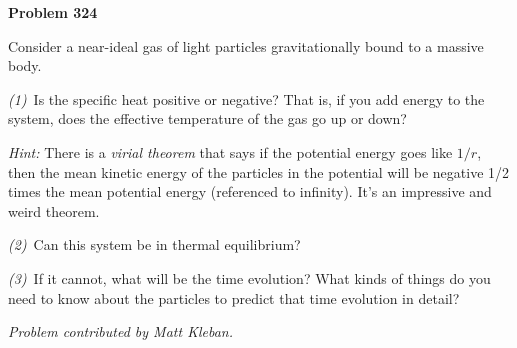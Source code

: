 \documentclass[12pt]{article}
\begin{document}
\begin{pottproblem}
\textbf{Problem 324}

Consider a near-ideal gas of light particles gravitationally bound to a massive body.

\textsl{(1)}~Is the specific heat positive or negative?
That is, if you add energy to the system, does the effective temperature of the gas go up or down?

\textsl{Hint:} There is a \emph{virial theorem} that says if the potential energy goes like $1/r$, then the mean kinetic energy of the particles in the potential will be negative 1/2 times the mean potential energy (referenced to infinity). It's an impressive and weird theorem.

\textsl{(2)}~Can this system be in thermal equilibrium?

\textsl{(3)}~If it cannot, what will be the time evolution?
What kinds of things do you need to know about the particles to predict that time evolution in detail?

{\normalsize\textsl{Problem contributed by Matt Kleban.}}

\end{pottproblem}
\end{document}

